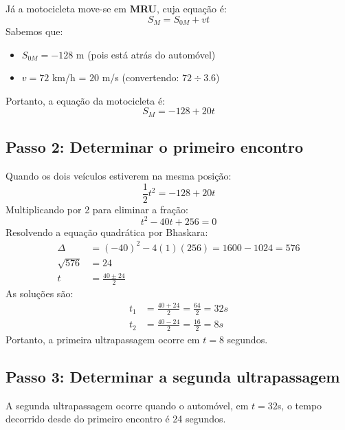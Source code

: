 \documentclass[a4paper,12pt]{article}
\begin{document}
Já a motocicleta move-se em \textbf{MRU}, cuja equação é:
\begin{equation}
    S_M = S_{0M} + v t
\end{equation}
Sabemos que:
\begin{itemize}
    \item $S_{0M} = -128$ m (pois está atrás do automóvel)
    \item $v = 72$ km/h = $20$ m/s (convertendo: $72 \div 3.6$)
\end{itemize}
Portanto, a equação da motocicleta é:
\begin{equation}
    S_M = -128 + 20t
\end{equation}

\subsection*{Passo 2: Determinar o primeiro encontro}

Quando os dois veículos estiverem na mesma posição:
\begin{equation}
    \frac{1}{2} t^2 = -128 + 20t
\end{equation}
Multiplicando por 2 para eliminar a fração:
\begin{equation}
    t^2 - 40t + 256 = 0
\end{equation}
Resolvendo a equação quadrática por Bhaskara:
\begin{align*}
    \Delta &= (-40)^2 - 4(1)(256) = 1600 - 1024 = 576 \\
    \sqrt{576} &= 24 \\
    t &= \frac{40 \pm 24}{2}
\end{align*}
As soluções são:
\begin{align*}
    t_1 &= \frac{40 + 24}{2} = \frac{64}{2} = 32s \\ 
    t_2 &= \frac{40 - 24}{2} = \frac{16}{2} = 8s
\end{align*}
Portanto, a primeira ultrapassagem ocorre em $t = 8$ segundos.

\subsection*{Passo 3: Determinar a segunda ultrapassagem}

A segunda ultrapassagem ocorre quando o automóvel, em $t = 32$s, o tempo decorrido desde do primeiro encontro \'e 24 segundos. 
\end{document}
